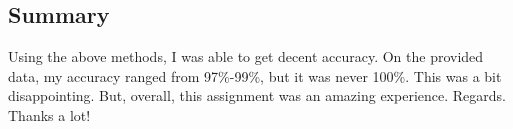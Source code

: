 \documentclass{article}
\begin{document}
    \subsection*{Summary}
    Using the above methods, I was able to get decent accuracy. On the provided data, my accuracy ranged from 97\%-99\%, but it was never 100\%. This was a bit disappointing. But, overall, this assignment was an amazing experience. Regards. Thanks a lot!
\end{document}

